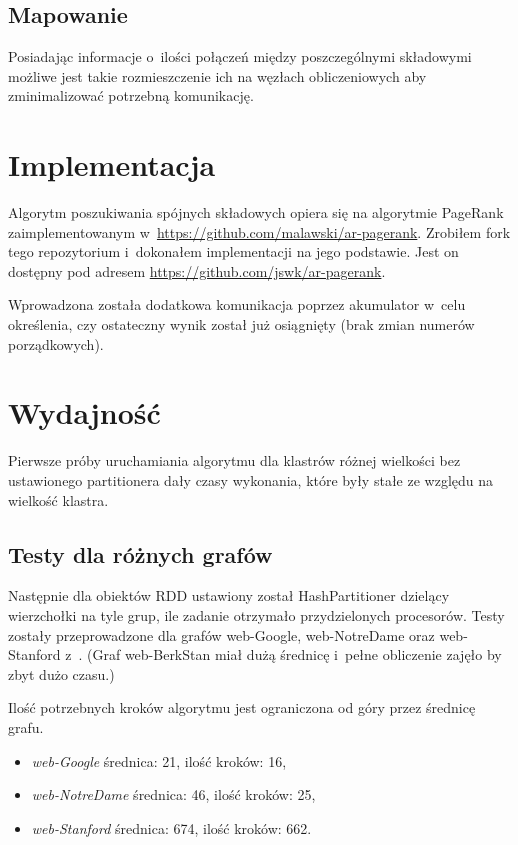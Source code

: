 \documentclass[a4paper; 12pt]{article}
\begin{document}
\subsection{Mapowanie}
Posiadając informacje o~ilości połączeń między poszczególnymi składowymi
możliwe jest takie rozmieszczenie ich na węzłach obliczeniowych aby
zminimalizować potrzebną komunikację.

\section{Implementacja}

Algorytm poszukiwania spójnych składowych \cite{ccpregel} opiera się na
algorytmie PageRank zaimplementowanym
w~\url{https://github.com/malawski/ar-pagerank}.
Zrobiłem fork tego repozytorium i~dokonałem implementacji na jego podstawie.
Jest on dostępny pod adresem \url{https://github.com/jswk/ar-pagerank}.

Wprowadzona została dodatkowa komunikacja poprzez akumulator w~celu określenia,
czy ostateczny wynik został już osiągnięty (brak zmian numerów porządkowych).

\section{Wydajność}

Pierwsze próby uruchamiania algorytmu dla klastrów różnej wielkości bez
ustawionego partitionera dały czasy wykonania, które były stałe ze względu na
wielkość klastra.

\subsection{Testy dla różnych grafów}

Następnie dla obiektów RDD ustawiony został HashPartitioner dzielący
wierzchołki na tyle grup, ile zadanie otrzymało przydzielonych procesorów.
Testy zostały przeprowadzone dla grafów web-Google, web-NotreDame oraz
web-Stanford z~\cite{realgraphs}.
(Graf web-BerkStan miał dużą średnicę i~pełne obliczenie zajęło by zbyt dużo czasu.)

Ilość potrzebnych kroków algorytmu jest ograniczona od góry przez średnicę grafu.
\begin{itemize}
    \item \emph{web-Google} średnica: 21, ilość kroków: 16,
    \item \emph{web-NotreDame} średnica: 46, ilość kroków: 25,
    \item \emph{web-Stanford} średnica: 674, ilość kroków: 662.
\end{itemize}
\end{document}
